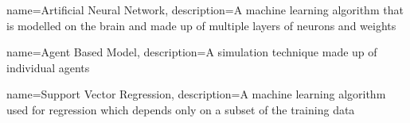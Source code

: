 {
        name=Artificial Neural Network,
        description={A machine learning algorithm that is modelled on the brain and made up of multiple layers of neurons and weights}
}





{
        name=Agent Based Model,
        description={A simulation technique made up of individual agents}
}

%    



%

%


{
        name=Support Vector Regression,
        description={A machine learning algorithm used for regression which depends only on a subset of the training data}
}

